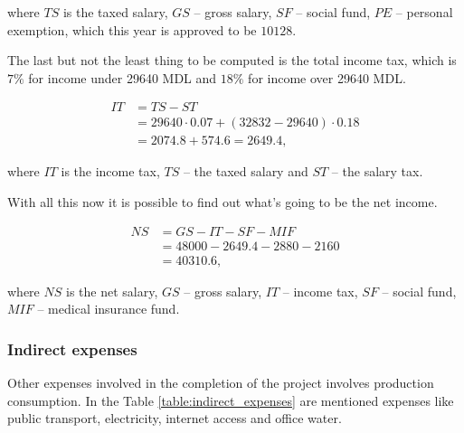 \noindent
where $TS$ is the taxed salary, $GS$ -- gross salary, $SF$ -- social fund, $PE$ -- personal exemption, which this year is approved to be $10128$.

The last but not the least thing to be computed is the total income tax, which is $7\%$ for income under 29640 MDL and $18\%$ for income over 29640 MDL.

\begin{equation}
\begin{split}
 IT &= TS - ST \\
      &= 29640 \cdot 0.07 + (32832 - 29640) \cdot 0.18 \\
      & = 2074.8 + 574.6 = 2649.4,
 \end{split}
\end{equation}

\noindent
where $IT$ is the income tax, $TS$ -- the taxed salary and $ST$ -- the salary tax. 

With all this now it is possible to find out what's going to be the net income.

\begin{equation}
\begin{split}
 NS &= GS - IT - SF - MIF \\
            &= 48000 - 2649.4 - 2880 - 2160 \\
            &= 40310.6,
\end{split}
\end{equation}

\noindent
where $NS$ is the net salary, $GS$ -- gross salary, $IT$ -- income tax, $SF$ -- social fund, $MIF$ -- medical insurance fund.

\subsubsection{Indirect expenses}
Other expenses involved in the completion of the project involves production consumption. In the Table \ref{table:indirect_expenses} are mentioned expenses like public transport, electricity, internet access and office water. 

\begin{table}[H]
\centering
\caption{Indirect expenses}
\label{table:indirect_expenses}
\end{table}

